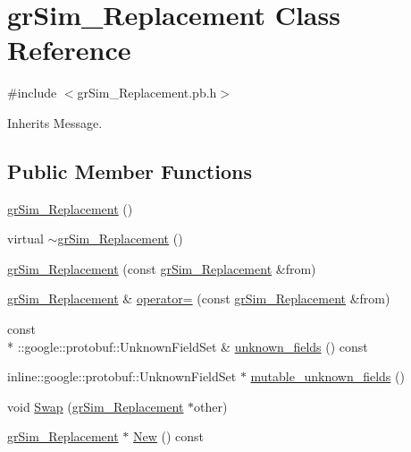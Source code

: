 \hypertarget{classgr_sim___replacement}{\section{gr\-Sim\-\_\-\-Replacement Class Reference}
\label{classgr_sim___replacement}
}


{\ttfamily \#include $<$gr\-Sim\-\_\-\-Replacement.\-pb.\-h$>$}



Inherits Message.

\subsection*{Public Member Functions}
\begin{DoxyCompactItemize}
\item 
\hyperlink{classgr_sim___replacement_a1cd8e7dd36ea5a1b096abb46ff4f1dbc}{gr\-Sim\-\_\-\-Replacement} ()
\item 
virtual \hyperlink{classgr_sim___replacement_aa5b7f1ef15841db3e54ad08ff81f7dcf}{$\sim$gr\-Sim\-\_\-\-Replacement} ()
\item 
\hyperlink{classgr_sim___replacement_addf53f62520049f506d45eff83db48b5}{gr\-Sim\-\_\-\-Replacement} (const \hyperlink{classgr_sim___replacement}{gr\-Sim\-\_\-\-Replacement} \&from)
\item 
\hyperlink{classgr_sim___replacement}{gr\-Sim\-\_\-\-Replacement} \& \hyperlink{classgr_sim___replacement_a4418c48f837ab70fb48453b106fef7f2}{operator=} (const \hyperlink{classgr_sim___replacement}{gr\-Sim\-\_\-\-Replacement} \&from)
\item 
const \\*
\-::google\-::protobuf\-::\-Unknown\-Field\-Set \& \hyperlink{classgr_sim___replacement_ac3eda8bc7b0f7d4c707fa15d61f15038}{unknown\-\_\-fields} () const 
\item 
inline\-::google\-::protobuf\-::\-Unknown\-Field\-Set $\ast$ \hyperlink{classgr_sim___replacement_a158d95820c6bf7e468ac023c186902b9}{mutable\-\_\-unknown\-\_\-fields} ()
\item 
void \hyperlink{classgr_sim___replacement_a84de4ae6d94b695dcc1032ffff935e1e}{Swap} (\hyperlink{classgr_sim___replacement}{gr\-Sim\-\_\-\-Replacement} $\ast$other)
\item 
\hyperlink{classgr_sim___replacement}{gr\-Sim\-\_\-\-Replacement} $\ast$ \hyperlink{classgr_sim___replacement_adb7ad493954b5361339d70be05dcaa73}{New} () const 
\item 

\end{DoxyCompactItemize}
